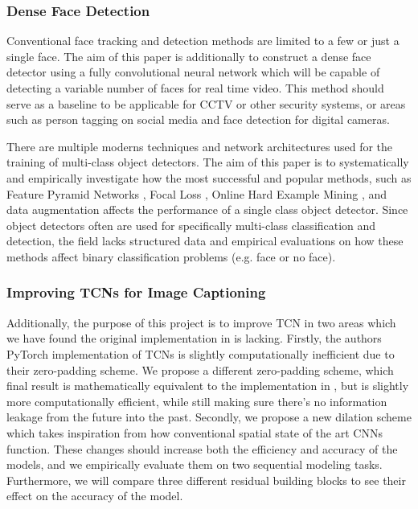\documentclass[a4paper, twoside]{article}
\begin{document}
\subsubsection{Dense Face Detection}
Conventional face tracking and detection methods are limited to a few or just a single face. The aim of this paper is additionally to construct a dense face detector using a fully convolutional neural network which will be capable of detecting a variable number of faces for real time video. This method should serve as a baseline to be applicable for CCTV or other security systems, or areas such as person tagging on social media and face detection for digital cameras.

There are multiple moderns techniques and network architectures used for the training of multi-class object detectors. The aim of this paper is to systematically and empirically investigate how the most successful and popular methods, such as Feature Pyramid Networks \cite{fpn}, Focal Loss \cite{retinanet}, Online Hard Example Mining \cite{ohem}, and data augmentation affects the performance of a single class object detector. Since object detectors often are used for specifically multi-class classification and detection, the field lacks structured data and empirical evaluations on how these methods affect binary classification problems (e.g. face or no face).


\subsubsection{Improving TCNs for Image Captioning}
Additionally, the purpose of this project is to improve TCN in two areas which we have found the original implementation in \cite{tcn} is lacking. Firstly, the authors PyTorch implementation of TCNs is slightly computationally inefficient due to their zero-padding scheme. We propose a different zero-padding scheme, which final result is mathematically equivalent to the implementation in \cite{tcn}, but is slightly more computationally efficient, while still making sure there's no information leakage from the future into the past. Secondly, we propose a new dilation scheme which takes inspiration from how conventional spatial state of the art CNNs function. These changes should increase both the efficiency and accuracy of the models, and we empirically evaluate them on two sequential modeling tasks. Furthermore, we will compare three different residual building blocks to see their effect on the accuracy of the model.
\end{document}
